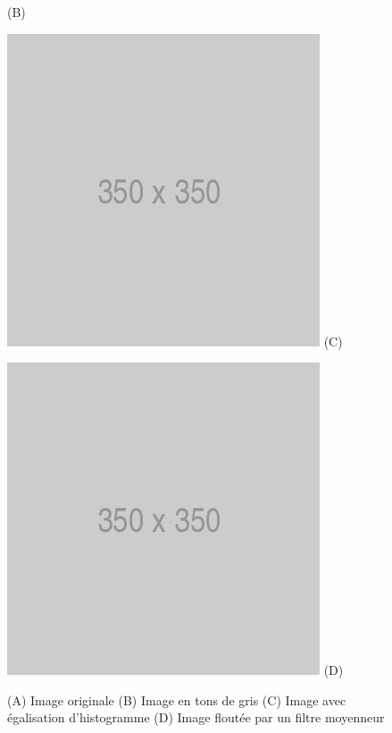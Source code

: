 \begin{figure}[htp]
\begin{minipage}{0.4\textwidth}
  (B)
\end{minipage}
\begin{minipage}{0.4\textwidth}
  \centering
  \includegraphics[width=\linewidth]{images/placeholder.png}
  (C)
\end{minipage}
\begin{minipage}{0.4\textwidth}
  \centering
  \includegraphics[width=\linewidth]{images/placeholder.png}
  (D)
\end{minipage}
\caption{(A) Image originale (B) Image en tons de gris (C) Image avec égalisation d'histogramme (D) Image floutée par un filtre moyenneur}
\label{fig:detection_pretraitement}
\end{figure}

